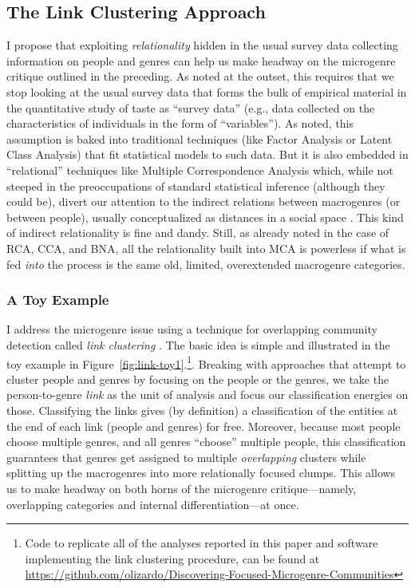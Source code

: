 \documentclass[a4paper,12pt]{article}
\begin{document}
\subsection{The Link Clustering Approach}
I propose that exploiting {\em relationality} hidden in the usual survey data collecting information on people and genres can help us make headway on the microgenre critique outlined in the preceding. As noted at the outset, this requires that we stop looking at the usual survey data that forms the bulk of empirical material in the quantitative study of taste as ``survey data'' (e.g., data collected on the characteristics of individuals in the form of ``variables''). As noted, this assumption is baked into traditional techniques (like Factor Analysis or Latent Class Analysis) that fit statistical models to such data. But it is also embedded in ``relational'' techniques like Multiple Correspondence Analysis which, while not steeped in the preoccupations of standard statistical inference (although they could be), divert our attention to the indirect relations between macrogenres (or between people), usually conceptualized as distances in a social space \citep{flemmen_etal18}. This kind of indirect relationality is fine and dandy. Still, as already noted in the case of RCA, CCA, and BNA, all the relationality built into MCA is powerless if what is fed {\em into} the process is the same old, limited, overextended macrogenre categories. 

\subsubsection{A Toy Example}
I address the microgenre issue using a technique for overlapping community detection called \textit{link clustering} \citep{ahn_etal10}. The basic idea is simple and illustrated in the toy example in Figure~\ref{fig:link-toy1}.\footnote{Code to replicate all of the analyses reported in this paper and software implementing the link clustering procedure, can be found at \url{https://github.com/olizardo/Discovering-Focused-Microgenre-Communities}}. Breaking with approaches that attempt to cluster people and genres by focusing on the people or the genres, we take the person-to-genre {\em link} as the unit of analysis and focus our classification energies on those. Classifying the links gives (by definition) a classification of the entities at the end of each link (people and genres) for free. Moreover, because most people choose multiple genres, and all genres ``choose'' multiple people, this classification guarantees that genres get assigned to multiple \textit{overlapping} clusters while splitting up the macrogenres into more relationally focused clumps. This allows us to make headway on both horns of the microgenre critique---namely, overlapping categories and internal differentiation---at once.
\end{document}
